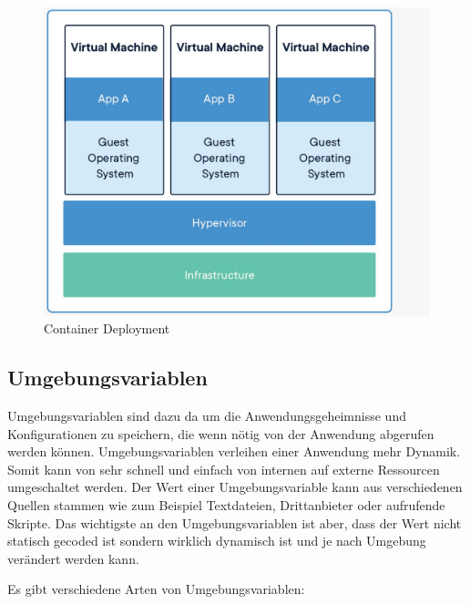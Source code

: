 \begin{figure}[h!]
    \centering
    \includegraphics[width=0.8\linewidth]{pics/container_deployment.jpeg}
    \caption{Container Deployment}
    \label{fig:enter-label}
\end{figure}

\subsection{Umgebungsvariablen}

Umgebungsvariablen sind dazu da um die Anwendungsgeheimnisse und Konfigurationen zu speichern, die wenn nötig von der Anwendung abgerufen werden können. Umgebungsvariablen verleihen einer Anwendung mehr Dynamik. Somit kann von sehr schnell und einfach von internen auf externe Ressourcen umgeschaltet werden. Der Wert einer Umgebungsvariable kann aus verschiedenen Quellen stammen wie zum Beispiel Textdateien, Drittanbieter oder aufrufende Skripte. Das wichtigste an den Umgebungsvariablen ist aber, dass der Wert nicht statisch gecoded ist sondern wirklich dynamisch ist und je nach Umgebung verändert werden kann.

Es gibt verschiedene Arten von Umgebungsvariablen:

